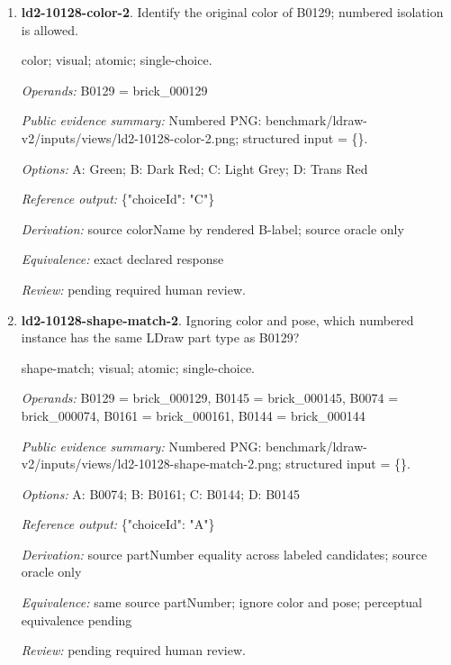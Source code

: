 \begin{enumerate}
\par{\small distance; source-data; atomic; single-choice.\par\textit{Operands:} B0310 = brick\_000310, B0105 = brick\_000105, B0031 = brick\_000031, B0075 = brick\_000075\par\textit{Public evidence summary:} \{"coordinateFrame": "Viewer world, millimeters, Euclidean distance", "centers": \{"B0075": [-72, 100, -60], "B0105": [-80, 133.6, 16], "B0310": [226.2552, 10.4, -29.7924], "B0031": [-44, 5.6, -28]\}\}\par\textit{Options:} A: B0031; B: B0310; C: B0105\par\textit{Reference output:} \{"choiceId": "C"\}\par\textit{Derivation:} Euclidean norm from public rounded centers\par\textit{Equivalence:} exact declared response\par\textit{Review:} machine checks passed; no human certification.}
\item \textbf{ld2-10128-color-2}. Identify the original color of B0129; numbered isolation is allowed.
\par{\small color; visual; atomic; single-choice.\par\textit{Operands:} B0129 = brick\_000129\par\textit{Public evidence summary:} Numbered PNG: benchmark/ldraw-v2/inputs/views/ld2-10128-color-2.png; structured input = \{\}.\par\textit{Options:} A: Green; B: Dark Red; C: Light Grey; D: Trans Red\par\textit{Reference output:} \{"choiceId": "C"\}\par\textit{Derivation:} source colorName by rendered B-label; source oracle only\par\textit{Equivalence:} exact declared response\par\textit{Review:} pending required human review.}
\item \textbf{ld2-10128-shape-match-2}. Ignoring color and pose, which numbered instance has the same LDraw part type as B0129?
\par{\small shape-match; visual; atomic; single-choice.\par\textit{Operands:} B0129 = brick\_000129, B0145 = brick\_000145, B0074 = brick\_000074, B0161 = brick\_000161, B0144 = brick\_000144\par\textit{Public evidence summary:} Numbered PNG: benchmark/ldraw-v2/inputs/views/ld2-10128-shape-match-2.png; structured input = \{\}.\par\textit{Options:} A: B0074; B: B0161; C: B0144; D: B0145\par\textit{Reference output:} \{"choiceId": "A"\}\par\textit{Derivation:} source partNumber equality across labeled candidates; source oracle only\par\textit{Equivalence:} same source partNumber; ignore color and pose; perceptual equivalence pending\par\textit{Review:} pending required human review.}

\end{enumerate}
